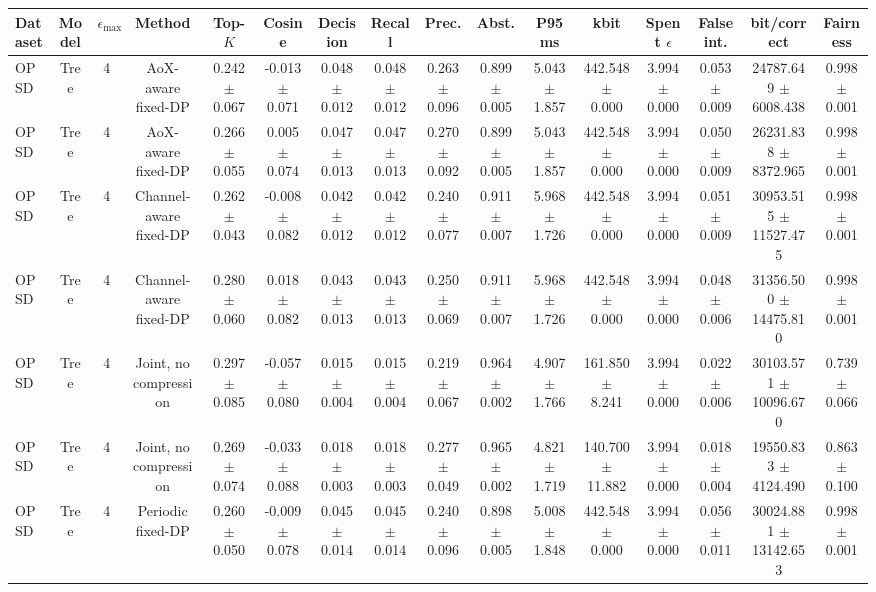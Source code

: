 \begin{tabular}{lccccccccccccccc}
\toprule
Dataset & Model & $\epsilon_{\max}$ & Method & Top-$K$ & Cosine & Decision & Recall & Prec. & Abst. & P95 ms & kbit & Spent $\epsilon$ & False int. & bit/correct & Fairness \\
\midrule
OPSD & Tree & 4 & AoX-aware fixed-DP & 0.242 $\pm$ 0.067 & -0.013 $\pm$ 0.071 & 0.048 $\pm$ 0.012 & 0.048 $\pm$ 0.012 & 0.263 $\pm$ 0.096 & 0.899 $\pm$ 0.005 & 5.043 $\pm$ 1.857 & 442.548 $\pm$ 0.000 & 3.994 $\pm$ 0.000 & 0.053 $\pm$ 0.009 & 24787.649 $\pm$ 6008.438 & 0.998 $\pm$ 0.001 \\
OPSD & Tree & 4 & AoX-aware fixed-DP & 0.266 $\pm$ 0.055 & 0.005 $\pm$ 0.074 & 0.047 $\pm$ 0.013 & 0.047 $\pm$ 0.013 & 0.270 $\pm$ 0.092 & 0.899 $\pm$ 0.005 & 5.043 $\pm$ 1.857 & 442.548 $\pm$ 0.000 & 3.994 $\pm$ 0.000 & 0.050 $\pm$ 0.009 & 26231.838 $\pm$ 8372.965 & 0.998 $\pm$ 0.001 \\
OPSD & Tree & 4 & Channel-aware fixed-DP & 0.262 $\pm$ 0.043 & -0.008 $\pm$ 0.082 & 0.042 $\pm$ 0.012 & 0.042 $\pm$ 0.012 & 0.240 $\pm$ 0.077 & 0.911 $\pm$ 0.007 & 5.968 $\pm$ 1.726 & 442.548 $\pm$ 0.000 & 3.994 $\pm$ 0.000 & 0.051 $\pm$ 0.009 & 30953.515 $\pm$ 11527.475 & 0.998 $\pm$ 0.001 \\
OPSD & Tree & 4 & Channel-aware fixed-DP & 0.280 $\pm$ 0.060 & 0.018 $\pm$ 0.082 & 0.043 $\pm$ 0.013 & 0.043 $\pm$ 0.013 & 0.250 $\pm$ 0.069 & 0.911 $\pm$ 0.007 & 5.968 $\pm$ 1.726 & 442.548 $\pm$ 0.000 & 3.994 $\pm$ 0.000 & 0.048 $\pm$ 0.006 & 31356.500 $\pm$ 14475.810 & 0.998 $\pm$ 0.001 \\
OPSD & Tree & 4 & Joint, no compression & 0.297 $\pm$ 0.085 & -0.057 $\pm$ 0.080 & 0.015 $\pm$ 0.004 & 0.015 $\pm$ 0.004 & 0.219 $\pm$ 0.067 & 0.964 $\pm$ 0.002 & 4.907 $\pm$ 1.766 & 161.850 $\pm$ 8.241 & 3.994 $\pm$ 0.000 & 0.022 $\pm$ 0.006 & 30103.571 $\pm$ 10096.670 & 0.739 $\pm$ 0.066 \\
OPSD & Tree & 4 & Joint, no compression & 0.269 $\pm$ 0.074 & -0.033 $\pm$ 0.088 & 0.018 $\pm$ 0.003 & 0.018 $\pm$ 0.003 & 0.277 $\pm$ 0.049 & 0.965 $\pm$ 0.002 & 4.821 $\pm$ 1.719 & 140.700 $\pm$ 11.882 & 3.994 $\pm$ 0.000 & 0.018 $\pm$ 0.004 & 19550.833 $\pm$ 4124.490 & 0.863 $\pm$ 0.100 \\
OPSD & Tree & 4 & Periodic fixed-DP & 0.260 $\pm$ 0.050 & -0.009 $\pm$ 0.078 & 0.045 $\pm$ 0.014 & 0.045 $\pm$ 0.014 & 0.240 $\pm$ 0.096 & 0.898 $\pm$ 0.005 & 5.008 $\pm$ 1.848 & 442.548 $\pm$ 0.000 & 3.994 $\pm$ 0.000 & 0.056 $\pm$ 0.011 & 30024.881 $\pm$ 13142.653 & 0.998 $\pm$ 0.001 \\

\end{tabular}
